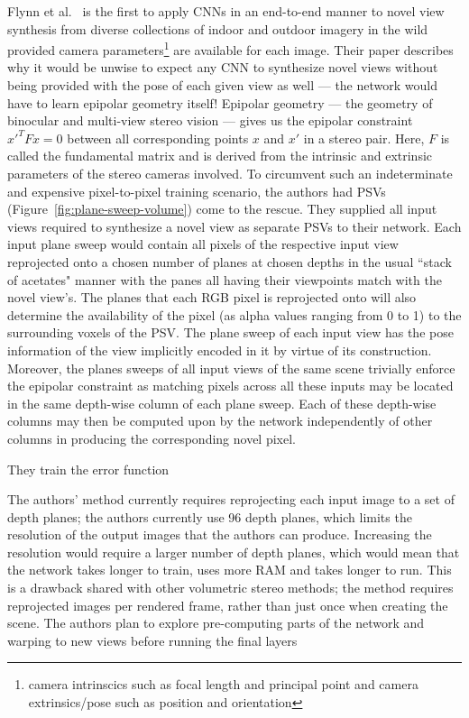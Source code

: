 Flynn et al.~\cite{deep_stereo_2016} is the first to apply CNNs in an end-to-end manner to novel view synthesis from diverse collections of indoor and outdoor imagery in the wild provided camera parameters\footnote{camera intrinscics such as focal length and principal point and camera extrinsics/pose such as position and orientation} are available for each image. Their paper describes why it would be unwise to expect any CNN to synthesize novel views without being provided with the pose of each given view as well --- the network would have to learn epipolar geometry itself! Epipolar geometry --- the geometry of binocular and multi-view stereo vision --- gives us the epipolar constraint $x'^T F x = 0$ between all corresponding points $x$ and $x'$ in a stereo pair. Here, $F$ is called the fundamental matrix and is derived from the intrinsic and extrinsic parameters of the stereo cameras involved. To circumvent such an indeterminate and expensive pixel-to-pixel training scenario, the authors had PSVs (Figure~\ref{fig:plane-sweep-volume}) come to the rescue. They supplied all input views required to synthesize a novel view as separate PSVs to their network. Each input plane sweep would contain all pixels of the respective input view reprojected onto a chosen number of planes at chosen depths in the usual ``stack of acetates" manner with the panes all having their viewpoints match with the novel view's. The planes that each RGB pixel is reprojected onto will also determine the availability of the pixel (as alpha values ranging from 0 to 1) to the surrounding voxels of the PSV. The plane sweep of each input view has the pose information of the view implicitly encoded in it by virtue of its construction. Moreover, the planes sweeps of all input views of the same scene trivially enforce the epipolar constraint as matching pixels across all these inputs may be located in the same depth-wise column of each plane sweep. Each of these depth-wise columns may then be computed upon by the network independently of other columns in producing the corresponding novel pixel.

They train the error function

The authors' method currently requires reprojecting each input image to a set of depth planes; the authors currently use 96 depth planes, which limits the resolution of the output images that the authors can produce. Increasing the resolution would require a larger number of depth planes, which would mean that the network takes longer to train, uses more RAM and takes longer to run. This is a drawback shared with other volumetric stereo methods; the method requires reprojected images per rendered frame, rather than just once when creating the scene. The authors plan to explore pre-computing parts of the network and warping to new views before running the final layers

